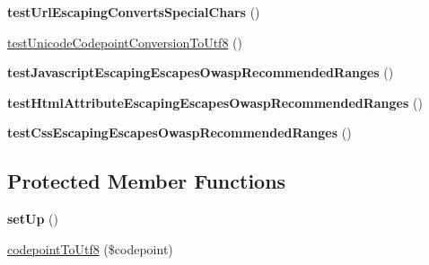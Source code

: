 \begin{DoxyCompactItemize}
\item 
{\bfseries test\+Url\+Escaping\+Converts\+Special\+Chars} ()\hypertarget{classTwig__Test__EscapingTest_a213749ac31b8af4087650d35fee2cd2c}{}\label{classTwig__Test__EscapingTest_a213749ac31b8af4087650d35fee2cd2c}

\item 
\hyperlink{classTwig__Test__EscapingTest_aba495346034cc4f10cdb5cff7c75a62e}{test\+Unicode\+Codepoint\+Conversion\+To\+Utf8} ()
\item 
{\bfseries test\+Javascript\+Escaping\+Escapes\+Owasp\+Recommended\+Ranges} ()\hypertarget{classTwig__Test__EscapingTest_afaddc8cd67b16db9cc7781ce1bbf409b}{}\label{classTwig__Test__EscapingTest_afaddc8cd67b16db9cc7781ce1bbf409b}

\item 
{\bfseries test\+Html\+Attribute\+Escaping\+Escapes\+Owasp\+Recommended\+Ranges} ()\hypertarget{classTwig__Test__EscapingTest_a27ef733adf0b029a05da1d7878dfd4e3}{}\label{classTwig__Test__EscapingTest_a27ef733adf0b029a05da1d7878dfd4e3}

\item 
{\bfseries test\+Css\+Escaping\+Escapes\+Owasp\+Recommended\+Ranges} ()\hypertarget{classTwig__Test__EscapingTest_a841a2c09a87317774935f0420eda19e2}{}\label{classTwig__Test__EscapingTest_a841a2c09a87317774935f0420eda19e2}

\end{DoxyCompactItemize}
\subsection*{Protected Member Functions}
\begin{DoxyCompactItemize}
\item 
{\bfseries set\+Up} ()\hypertarget{classTwig__Test__EscapingTest_a10c37464ebec57ac4690f506d44eeb58}{}\label{classTwig__Test__EscapingTest_a10c37464ebec57ac4690f506d44eeb58}

\item 
\hyperlink{classTwig__Test__EscapingTest_a58ce011f723e786255d210c124db95ce}{codepoint\+To\+Utf8} (\$codepoint)
\end{DoxyCompactItemize}
